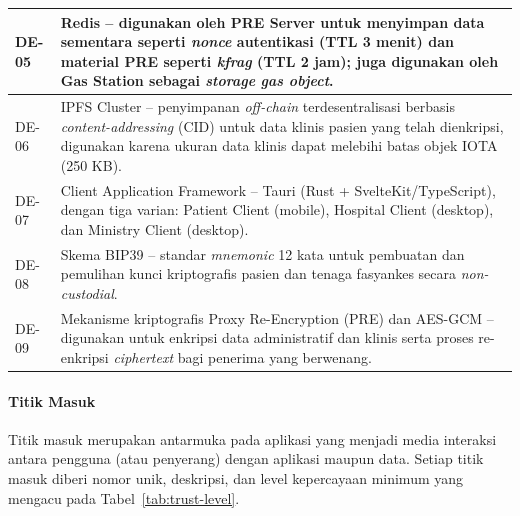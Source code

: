 \begin{xltabular}{\textwidth}{|>{\centering\arraybackslash}p{1.2cm}|X|}
    DE-05 & Redis -- digunakan oleh PRE Server untuk menyimpan data sementara seperti \textit{nonce} autentikasi (TTL 3 menit) dan material PRE seperti \textit{kfrag} (TTL 2 jam); juga digunakan oleh Gas Station sebagai \textit{storage} \textit{gas object}. \\
    \hline

    DE-06 & IPFS Cluster -- penyimpanan \textit{off-chain} terdesentralisasi berbasis \textit{content-addressing} (CID) untuk data klinis pasien yang telah dienkripsi, digunakan karena ukuran data klinis dapat melebihi batas objek IOTA (250 KB). \\
    \hline

    DE-07 & Client Application Framework -- Tauri (Rust + SvelteKit/TypeScript), dengan tiga varian: Patient Client (mobile), Hospital Client (desktop), dan Ministry Client (desktop). \\
    \hline

    DE-08 & Skema BIP39 -- standar \textit{mnemonic} 12 kata untuk pembuatan dan pemulihan kunci kriptografis pasien dan tenaga fasyankes secara \textit{non-custodial}. \\
    \hline

    DE-09 & Mekanisme kriptografis Proxy Re-Encryption (PRE) dan AES-GCM -- digunakan untuk enkripsi data administratif dan klinis serta proses re-enkripsi \textit{ciphertext} bagi penerima yang berwenang. \\
    \hline

\end{xltabular}

\paragraph{Titik Masuk}

Titik masuk merupakan antarmuka pada aplikasi yang menjadi media interaksi antara pengguna (atau penyerang) dengan aplikasi maupun data. Setiap titik masuk diberi nomor unik, deskripsi, dan level kepercayaan minimum yang mengacu pada Tabel~\ref{tab:trust-level}.

